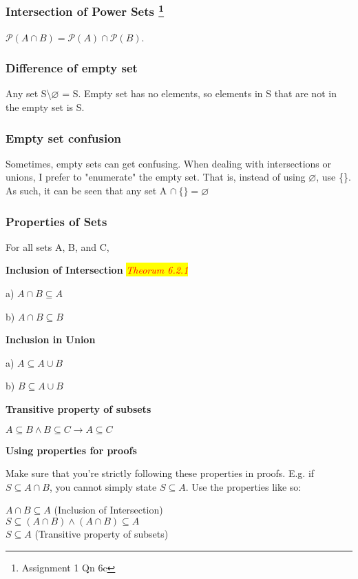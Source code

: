 \documentclass{article}
\newcommand{\theorum}[1]{\quad \quad \colorbox{yellow}{\textit{\textcolor{red}{Theorum #1}}}}
\newcommand{\sub}[1]{\vspace{10pt}\textbf{#1}}
\begin{document}
\subsubsection[Intersection of Power Sets]{Intersection of Power Sets \footnote{Assignment 1 Qn 6c}}
$\mathcal{P}(A \cap B) = \mathcal{P}(A) \cap \mathcal{P}(B)$.

\subsubsection{Difference of empty set}
Any set S\textbackslash$\varnothing$ = S.
Empty set has no elements, so elements in S that are not in the empty set is S.

\subsubsection{Empty set confusion}
Sometimes, empty sets can get confusing. When dealing with intersections or unions, I prefer to "enumerate" the empty set. That is, instead of using $\varnothing$, use \{\}. As such, it can be seen that any set A $\cap\ \{\} = \varnothing$

\subsubsection{Properties of Sets}
For all sets A, B, and C, 

\vspace{10pt}

\textbf{Inclusion of Intersection} \theorum{6.2.1}

a)  $A \cap B \subseteq A$

b) $A \cap B \subseteq B$

\vspace{10pt}

\textbf{Inclusion in Union}

a) $A \subseteq A \cup B$

b) $B \subseteq A \cup B$

\vspace{10pt}

\textbf{Transitive property of subsets}

$A \subseteq B \wedge B \subseteq C \rightarrow A \subseteq C$

\sub{Using properties for proofs}

Make sure that you're strictly following these properties in proofs. E.g. if $S \subseteq A\cap B$, you cannot simply state $S \subseteq A$. Use the properties like so:
\begin{center}
    $A \cap B \subseteq A$ (Inclusion of Intersection)\\
    $S \subseteq (A \cap B) \wedge (A \cap B) \subseteq A$\\
    $S \subseteq A$ (Transitive property of subsets)
\end{center}
\end{document}
